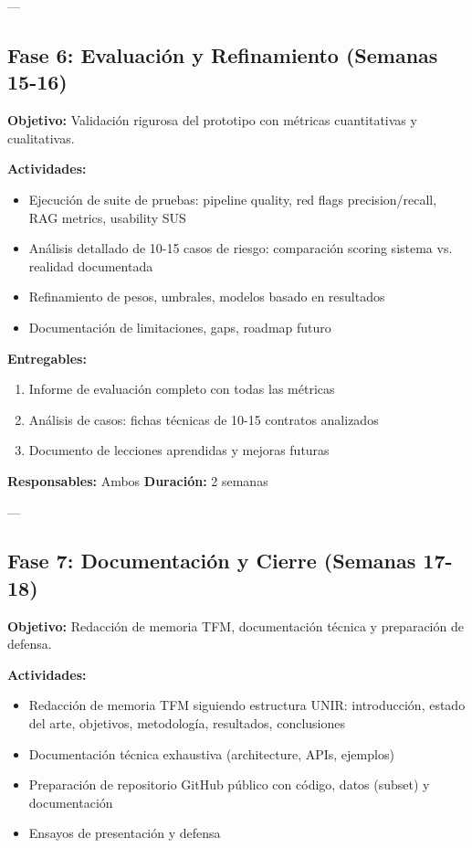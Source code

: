 \documentclass[11pt,a4paper,spanish]{book}
\numberwithin{equation}{chapter}
\numberwithin{figure}{chapter}
\begin{document}
---

\subsection{Fase 6: Evaluación y Refinamiento (Semanas 15-16)}

\textbf{Objetivo:} Validación rigurosa del prototipo con métricas cuantitativas y cualitativas.

\textbf{Actividades:}
\begin{itemize}
\item Ejecución de suite de pruebas: pipeline quality, red flags precision/recall, RAG metrics, usability SUS
\item Análisis detallado de 10-15 casos de riesgo: comparación scoring sistema vs. realidad documentada
\item Refinamiento de pesos, umbrales, modelos basado en resultados
\item Documentación de limitaciones, gaps, roadmap futuro
\end{itemize}

\textbf{Entregables:}
\begin{enumerate}
\item Informe de evaluación completo con todas las métricas
\item Análisis de casos: fichas técnicas de 10-15 contratos analizados
\item Documento de lecciones aprendidas y mejoras futuras
\end{enumerate}

\textbf{Responsables:} Ambos
\textbf{Duración:} 2 semanas

---

\subsection{Fase 7: Documentación y Cierre (Semanas 17-18)}

\textbf{Objetivo:} Redacción de memoria TFM, documentación técnica y preparación de defensa.

\textbf{Actividades:}
\begin{itemize}
\item Redacción de memoria TFM siguiendo estructura UNIR: introducción, estado del arte, objetivos, metodología, resultados, conclusiones
\item Documentación técnica exhaustiva (architecture, APIs, ejemplos)
\item Preparación de repositorio GitHub público con código, datos (subset) y documentación
\item Ensayos de presentación y defensa
\end{itemize}
\end{document}
